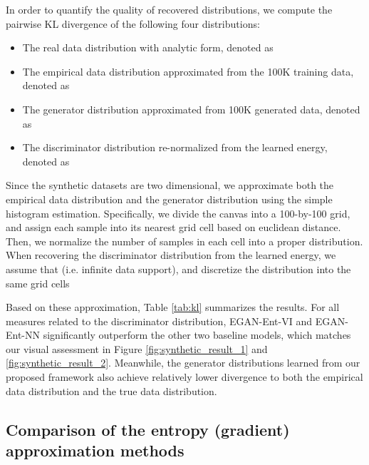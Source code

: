 \documentclass[a4paper]{article}
\begin{document}
\setlength\tabcolsep{6pt}

In order to quantify the quality of recovered distributions, we compute the pairwise KL divergence of the following four distributions:
\begin{itemize}
\item The real data distribution with analytic form, denoted as 
\item The empirical data distribution approximated from the 100K training data, denoted as 
\item The generator distribution approximated from 100K generated data, denoted as 
\item The discriminator distribution re-normalized from the learned energy, denoted as 
\end{itemize}
Since the synthetic datasets are two dimensional, we approximate both the empirical data distribution and the generator distribution using the simple histogram estimation.
Specifically, we divide the canvas into a 100-by-100 grid, and assign each sample into its nearest grid cell based on euclidean distance.
Then, we normalize the number of samples in each cell into a proper distribution.
When recovering the discriminator distribution from the learned energy, we assume that  (i.e. infinite data support), and discretize the distribution into the same grid cells

Based on these approximation, Table \ref{tab:kl} summarizes the results.
For all measures related to the discriminator distribution, EGAN-Ent-VI and EGAN-Ent-NN significantly outperform the other two baseline models, which matches our visual assessment in Figure \ref{fig:synthetic_result_1} and \ref{fig:synthetic_result_2}.
Meanwhile, the generator distributions learned from our proposed framework also achieve relatively lower divergence to both the empirical data distribution and the true data distribution.

\subsection{Comparison of the entropy (gradient) approximation methods}
\label{sec:vi_vs_knn}
\end{document}
